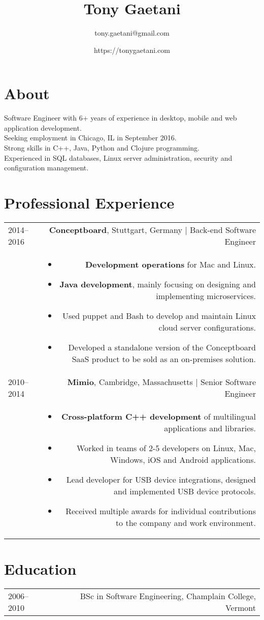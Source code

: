 \documentclass[10pt]{article}
\title{\bfseries\Large Tony Gaetani}
\author{tony.gaetani@gmail.com}
\date{https://tonygaetani.com}
\begin{document}
\maketitle

\section*{About}
Software Engineer with 6+ years of experience in desktop, mobile and web application development.\\
Seeking employment in Chicago, IL in September 2016.\\
Strong skills in C++, Java, Python and Clojure programming.\\
Experienced in SQL databases, Linux server administration, security and configuration management.\\

\section*{Professional Experience}
\begin{tabular}{L!{}R}
2014--2016&{\bf Conceptboard}, Stuttgart, Germany | Back-end Software Engineer\\
&\begin{itemize}
  \item {\bf Development operations} for Mac and Linux.
  \item {\bf Java development}, mainly focusing on designing and implementing microservices.
  \item Used puppet and Bash to develop and maintain Linux cloud server configurations.
  \item Developed a standalone version of the Conceptboard SaaS product to be sold as an on-premises solution.
\end{itemize}\\
2010--2014&{\bf Mimio}, Cambridge, Massachusetts | Senior Software Engineer\\
&\begin{itemize}
  \item {\bf Cross-platform C++ development} of multilingual applications and libraries.
  \item Worked in teams of 2-5 developers on Linux, Mac, Windows, iOS and Android applications.
  \item Lead developer for USB device integrations, designed and implemented USB device protocols.
  \item Received multiple awards for individual contributions to the company and work environment.
\end{itemize}\\
\end{tabular}
 
\section*{Education}
\begin{tabular}{L!{}R}
2006--2010&BSc in Software Engineering, Champlain College, Vermont\\
\end{tabular}
 
 
\end{document}

